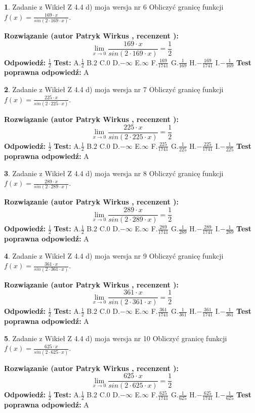 \documentclass[12pt, a4paper]{article}
\theoremstyle{definition} %
\newtheorem{zad}{}
\newcommand{\zadStart}[1]{\begin{zad}#1\newline}
\newcommand{\zadStop}{\end{zad}}
\newcommand{\rozwStart}[2]{\noindent \textbf{Rozwiązanie (autor #1 , recenzent #2): }\newline}
\newcommand{\rozwStop}{\newline}
\newcommand{\odpStart}{\noindent \textbf{Odpowiedź:}\newline}
\newcommand{\odpStop}{\newline}
\newcommand{\testStart}{\noindent \textbf{Test:}\newline}
\newcommand{\testStop}{\newline}
\newcommand{\kluczStart}{\noindent \textbf{Test poprawna odpowiedź:}\newline}
\newcommand{\kluczStop}{\newline}
\begin{document}
\zadStart{Zadanie z Wikieł Z 4.4 d) moja wersja nr 6}
Obliczyć granicę funkcji $f(x)=\frac{169\cdot x}{sin(2 \cdot169\cdot x)}$.
\zadStop
\rozwStart{Patryk Wirkus}{}
$$\lim\limits_{x\to 0}\frac{169\cdot x}{sin(2 \cdot169\cdot x)}=\frac{1}{2}$$
\rozwStop
\odpStart
$\frac{1}{2}$
\odpStop
\testStart
A.$\frac{1}{2}$
B.$2$
C.$0$
D.$-\infty$
E.$\infty$
F.$\frac{169}{1741}$
G.$\frac{1}{169}$
H.$-\frac{169}{1741}$
I.$-\frac{1}{169}$
\testStop
\kluczStart
A
\kluczStop



\zadStart{Zadanie z Wikieł Z 4.4 d) moja wersja nr 7}
Obliczyć granicę funkcji $f(x)=\frac{225\cdot x}{sin(2 \cdot225\cdot x)}$.
\zadStop
\rozwStart{Patryk Wirkus}{}
$$\lim\limits_{x\to 0}\frac{225\cdot x}{sin(2 \cdot225\cdot x)}=\frac{1}{2}$$
\rozwStop
\odpStart
$\frac{1}{2}$
\odpStop
\testStart
A.$\frac{1}{2}$
B.$2$
C.$0$
D.$-\infty$
E.$\infty$
F.$\frac{225}{1741}$
G.$\frac{1}{225}$
H.$-\frac{225}{1741}$
I.$-\frac{1}{225}$
\testStop
\kluczStart
A
\kluczStop



\zadStart{Zadanie z Wikieł Z 4.4 d) moja wersja nr 8}
Obliczyć granicę funkcji $f(x)=\frac{289\cdot x}{sin(2 \cdot289\cdot x)}$.
\zadStop
\rozwStart{Patryk Wirkus}{}
$$\lim\limits_{x\to 0}\frac{289\cdot x}{sin(2 \cdot289\cdot x)}=\frac{1}{2}$$
\rozwStop
\odpStart
$\frac{1}{2}$
\odpStop
\testStart
A.$\frac{1}{2}$
B.$2$
C.$0$
D.$-\infty$
E.$\infty$
F.$\frac{289}{1741}$
G.$\frac{1}{289}$
H.$-\frac{289}{1741}$
I.$-\frac{1}{289}$
\testStop
\kluczStart
A
\kluczStop



\zadStart{Zadanie z Wikieł Z 4.4 d) moja wersja nr 9}
Obliczyć granicę funkcji $f(x)=\frac{361\cdot x}{sin(2 \cdot361\cdot x)}$.
\zadStop
\rozwStart{Patryk Wirkus}{}
$$\lim\limits_{x\to 0}\frac{361\cdot x}{sin(2 \cdot361\cdot x)}=\frac{1}{2}$$
\rozwStop
\odpStart
$\frac{1}{2}$
\odpStop
\testStart
A.$\frac{1}{2}$
B.$2$
C.$0$
D.$-\infty$
E.$\infty$
F.$\frac{361}{1741}$
G.$\frac{1}{361}$
H.$-\frac{361}{1741}$
I.$-\frac{1}{361}$
\testStop
\kluczStart
A
\kluczStop



\zadStart{Zadanie z Wikieł Z 4.4 d) moja wersja nr 10}
Obliczyć granicę funkcji $f(x)=\frac{625\cdot x}{sin(2 \cdot625\cdot x)}$.
\zadStop
\rozwStart{Patryk Wirkus}{}
$$\lim\limits_{x\to 0}\frac{625\cdot x}{sin(2 \cdot625\cdot x)}=\frac{1}{2}$$
\rozwStop
\odpStart
$\frac{1}{2}$
\odpStop
\testStart
A.$\frac{1}{2}$
B.$2$
C.$0$
D.$-\infty$
E.$\infty$
F.$\frac{625}{1741}$
G.$\frac{1}{625}$
H.$-\frac{625}{1741}$
I.$-\frac{1}{625}$
\testStop
\kluczStart
A
\kluczStop
\end{document}
